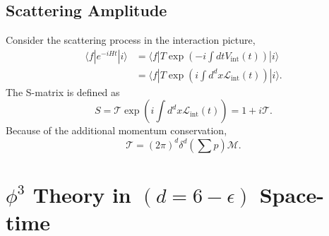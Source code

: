 \subsection{Scattering Amplitude}
Consider the scattering process in the interaction picture,
\begin{equation}
\begin{aligned}
	\langle f| e^{-iHt} |i\rangle &= \langle f| T \exp \left(-i\int dt V_{\mathrm{int}}(t) \right)|i\rangle \\
	&= \langle f| T \exp \left(i\int d^d x \mathcal{L}_{\mathrm{int}}(t) \right)|i\rangle.
\end{aligned}
\end{equation}
The S-matrix is defined as
\begin{equation}
	S = \mathcal{T} \exp \left(i\int d^d x \mathcal{L}_{\mathrm{int}}(t) \right)
	= 1 + i \mathcal{T}.
\end{equation}
Because of the additional momentum conservation,
\begin{equation}
	\mathcal{T} = (2\pi)^d \delta^d\left(\sum p\right) \mathcal M.
\end{equation}


\section{$\phi^3$ Theory in $(d=6-\epsilon)$ Space-time}

